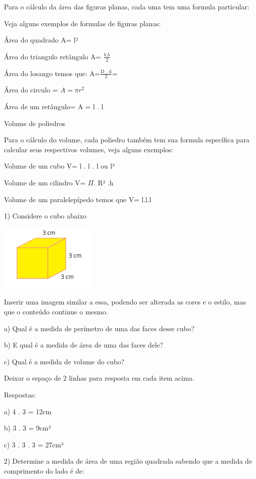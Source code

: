 Para o cálculo da área das figuras planas, cada uma tem uma formula
particular:

Veja alguns exemplos de formulas de figuras planas:

Área do quadrado A= l²

Área do triangulo retângulo A= \(\frac{b.h}{2}\)

Área do losango temos que: A=\(\frac{\text{D\ .\ d}}{2}\)=

Área do circulo = \(A = \pi r^{2}\)

Área de um retângulo= A = l . l

Volume de poliedros

Para o cálculo do volume, cada poliedro também tem sua formula
específica para calcular seus respectivos volumes, veja alguns exemplos:

Volume de um cubo V= l . l . l ou l³

Volume de um cilindro V= \(\Pi\). R² .h

Volume de um paralelepípedo temos que V= l.l.l


1) Considere o cubo abaixo

\includegraphics[width=1.89583in,height=1.27083in]{./imgSAEB_8_MAT/media/image42.png}

Inserir uma imagem similar a essa, podendo ser alterada as cores e o
estilo, mas que o conteúdo continue o mesmo.

a) Qual é a medida de perímetro de uma das faces desse cubo?

b) E qual é a medida de área de uma das faces dele?

c) Qual é a medida de volume do cubo?

Deixar o espaço de 2 linhas para resposta em cada item acima.

Respostas:

a) 4 . 3 = 12cm

b) 3 . 3 = 9cm²

c) 3 . 3 . 3 = 27cm³

2) Determine a medida de área de uma região quadrada sabendo que a
medida de comprimento do lado é de:

